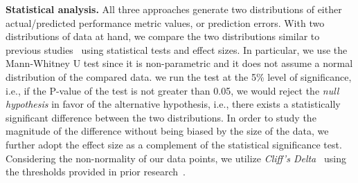 \noindent\textbf{Statistical analysis.}
All three approaches generate two distributions of either actual/predicted performance metric values, or prediction errors. With two distributions of data at hand, we compare the two distributions similar to previous studies~\citep{Chen:2016:CHD:2950290.2950303} using statistical tests and effect sizes. In particular, we use the Mann-Whitney U test since it is non-parametric and it does not assume a normal distribution of the compared data. we run the test at the 5\% level of significance, i.e., if the P-value of the test is not greater than 0.05, we would reject the \emph{null hypothesis} in favor of the alternative hypothesis, i.e., there exists a statistically significant difference between the two distributions. In order to study the magnitude of the difference without being biased by the size of the data, we further adopt the effect size as a complement
of the statistical significance test. Considering the non-normality of our data points, we
utilize \emph{Cliff's Delta}~\citep{cliff1996ordinal} using the
thresholds provided in prior research~\citep{romano2006appropriate}.


